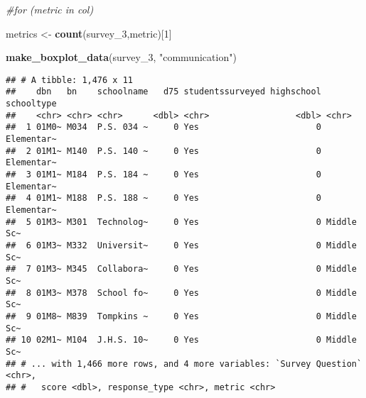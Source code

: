 \documentclass[]{article}
\newenvironment{Shaded}{\begin{snugshade}}{\end{snugshade}}
\newcommand{\CommentTok}[1]{\textcolor[rgb]{0.56,0.35,0.01}{\textit{#1}}}
\newcommand{\ControlFlowTok}[1]{\textcolor[rgb]{0.13,0.29,0.53}{\textbf{#1}}}
\newcommand{\DecValTok}[1]{\textcolor[rgb]{0.00,0.00,0.81}{#1}}
\newcommand{\KeywordTok}[1]{\textcolor[rgb]{0.13,0.29,0.53}{\textbf{#1}}}
\newcommand{\NormalTok}[1]{#1}
\newcommand{\OperatorTok}[1]{\textcolor[rgb]{0.81,0.36,0.00}{\textbf{#1}}}
\newcommand{\StringTok}[1]{\textcolor[rgb]{0.31,0.60,0.02}{#1}}
\begin{document}
\begin{Shaded}
\begin{Highlighting}[]
\CommentTok{#for (metric in col)}

\NormalTok{metrics <-}\StringTok{ }\KeywordTok{count}\NormalTok{(survey_}\DecValTok{3}\NormalTok{,metric)[}\DecValTok{1}\NormalTok{]}
\end{Highlighting}
\end{Shaded}

\begin{Shaded}
\end{Shaded}

\begin{Shaded}
\begin{Highlighting}[]
\KeywordTok{make_boxplot_data}\NormalTok{(survey_}\DecValTok{3}\NormalTok{, }\StringTok{"communication"}\NormalTok{)}
\end{Highlighting}
\end{Shaded}

\begin{verbatim}
## # A tibble: 1,476 x 11
##    dbn   bn    schoolname   d75 studentssurveyed highschool schooltype
##    <chr> <chr> <chr>      <dbl> <chr>                 <dbl> <chr>     
##  1 01M0~ M034  P.S. 034 ~     0 Yes                       0 Elementar~
##  2 01M1~ M140  P.S. 140 ~     0 Yes                       0 Elementar~
##  3 01M1~ M184  P.S. 184 ~     0 Yes                       0 Elementar~
##  4 01M1~ M188  P.S. 188 ~     0 Yes                       0 Elementar~
##  5 01M3~ M301  Technolog~     0 Yes                       0 Middle Sc~
##  6 01M3~ M332  Universit~     0 Yes                       0 Middle Sc~
##  7 01M3~ M345  Collabora~     0 Yes                       0 Middle Sc~
##  8 01M3~ M378  School fo~     0 Yes                       0 Middle Sc~
##  9 01M8~ M839  Tompkins ~     0 Yes                       0 Middle Sc~
## 10 02M1~ M104  J.H.S. 10~     0 Yes                       0 Middle Sc~
## # ... with 1,466 more rows, and 4 more variables: `Survey Question` <chr>,
## #   score <dbl>, response_type <chr>, metric <chr>
\end{verbatim}
\end{document}
